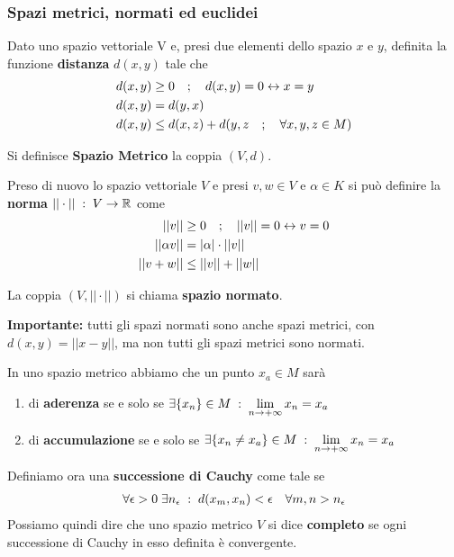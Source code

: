 \newpage
\subsubsection{Spazi metrici, normati ed euclidei}

Dato uno spazio  vettoriale V e, presi due elementi dello spazio $x$ e $y$, definita la funzione \textbf{distanza} $d(x,y)$ tale che
\begin{align}
	d(x,y) &\geq 0 \quad ; \quad d(x,y) = 0 \leftrightarrow x=y\\
	d(x,y) & = d(y,x)\\
	d(x,y) &\leq d(x,z) + d(y,z \quad ; \quad \forall x,y,z \in M) 
\end{align}

Si definisce \textbf{Spazio Metrico} la coppia $(V,d)$.

Preso di nuovo lo spazio vettoriale $V$ e presi $v,w\in V$ e $\alpha \in K$ si può definire la \textbf{norma} $||\cdot|| \; : \; V \rightarrow \mathbb{R}$ come
\begin{align}
	||v|| &\geq 0 \quad ; \quad ||v|| = 0 \leftrightarrow v= 0\\
	||\alpha v || &= |\alpha|\cdot ||v||\\
	||v + w|| &\leq ||v|| + ||w||
\end{align}

La coppia $(V, ||\cdot ||)$ si chiama \textbf{spazio normato}. 


\textbf{Importante:} tutti gli spazi normati sono anche spazi metrici, con $d(x,y) = ||x-y||$, ma non tutti gli spazi metrici sono normati.

In uno spazio metrico abbiamo che un punto $x_a\in M$ sarà
\begin{enumerate}
	\item di \textbf{aderenza} se e solo se $\exists \{x_n\} \in M \; : \; \underset{n \rightarrow +\infty}{\lim} \, x_n = x_a$
	\item di \textbf{accumulazione} se e solo se $\exists \{x_n\neq x_a\} \in M \; : \; \underset{n \rightarrow +\infty}{\lim} \, x_n = x_a$
\end{enumerate}

Definiamo ora una \textbf{successione di Cauchy} come tale se
\begin{align}
	\forall \epsilon > 0 \; \exists n_\epsilon \; : \; d(x_m,x_n) <\epsilon \quad \forall m,n > n_\epsilon
\end{align}
Possiamo quindi dire che uno spazio metrico $V$ si dice \textbf{completo} se ogni successione di Cauchy in esso definita è convergente.


